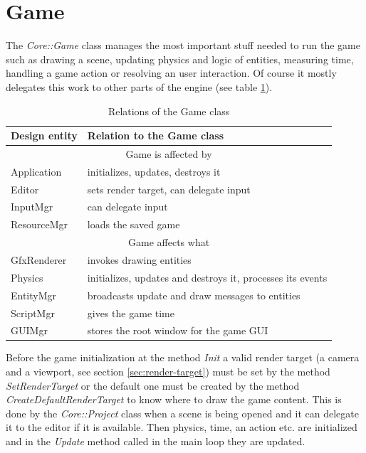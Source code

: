\documentclass[a4paper, 12pt]{report}
\begin{document}
\section{Game}

The \emph{Core::Game} class manages the most important stuff needed to run the game such as drawing a scene, updating physics and logic of entities, measuring time, handling a game action or resolving an user interaction. Of course it mostly delegates this work to other parts of the engine (see table \ref{tab:game-relation}).

\begin{table}[htbp]
	\centering
		\begin{tabular}{|p{0.18\hsize}|p{0.75\hsize}|}
			\hline
			Design entity & Relation to the Game class\\
			\hline
			\multicolumn{2}{|c|}{Game is affected by}\\
			\hline
			Application & initializes, updates, destroys it\\
			Editor & sets render target, can delegate input\\
			InputMgr & can delegate input\\
			ResourceMgr & loads the saved game\\
			\hline
			\multicolumn{2}{|c|}{Game affects what}\\
			\hline
			GfxRenderer & invokes drawing entities\\
			Physics & initializes, updates and destroys it, processes its events\\
			EntityMgr & broadcasts update and draw messages to entities\\
			ScriptMgr & gives the game time\\
			GUIMgr & stores the root window for the game GUI\\
			\hline
		\end{tabular}
	\caption[Relations of the Game class]{Relations of the Game class}
	\label{tab:game-relation}
\end{table}


Before the game initialization at the method \emph{Init} a valid render target (a camera and a viewport, see section \ref{sec:render-target}) must be set by the method \emph{SetRenderTarget} or the default one must be created by the method \emph{CreateDefaultRenderTarget} to know where to draw the game content. This is done by the \emph{Core::Project} class when a scene is being opened and it can delegate it to the editor if it is available. Then physics, time, an action etc. are initialized and in the \emph{Update} method called in the main loop they are updated.
\end{document}
